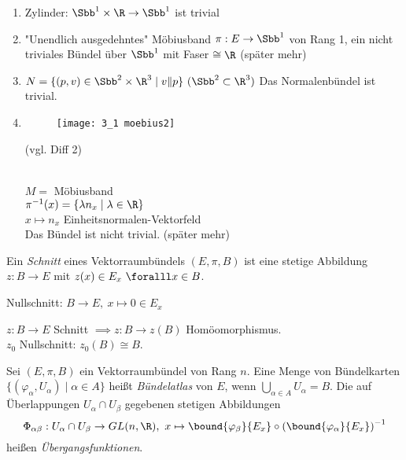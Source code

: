 \begin{exmp*}
	\begin{enumerate}[label = {\roman*})]
		\item 	Zylinder: $ \Sbb^1 \times \R \to \Sbb^1 $ ist trivial
		\item "Unendlich ausgedehntes" Möbiusband  $ \pi: E \to \Sbb^1 $ von Rang 1, ein nicht triviales Bündel über $\Sbb^1$ mit Faser $\cong \R$ (später mehr)
		\item $ N = \{(p,v) \in \Sbb^2 \times \R^3 \mid v \| p\}\ (\Sbb^2 \subset \R^3) $
			Das Normalenbündel ist trivial.
		\item \begin{minipage}{\linewidth}
				\begin{wrapfigure}{R}{5cm}
					\centering
					\texttt{[image: 3\_1 moebius2]}
				\end{wrapfigure}
				(vgl. Diff 2)
			\end{minipage} \\
			$ M = $ Möbiusband\\
			$ \pi^{-1}(x) = \{\lambda n_x \mid \lambda \in \R\} $\\
			$ x \mapsto n_x$ Einheitsnormalen-Vektorfeld\\
			Das Bündel ist nicht trivial. (später mehr)
	\end{enumerate}
\end{exmp*}

\begin{defn}[Schnitt]
	Ein \emph{Schnitt} eines Vektorraumbündels $ (E,\pi,B) $ ist eine stetige Abbildung $ z: B \to E $ mit $z(x) \in E_x\ \foralll x \in B$.
\end{defn}
	
\begin{exmp*}
	Nullschnitt: $ B \to E,\ x \mapsto 0 \in E_x $
\end{exmp*}

\begin{rem*}
	$ z: B \to E $ Schnitt $ \implies z: B \to z(B) $ Homöomorphismus.\\
	$z_0$ Nullschnitt: $z_0(B) \cong B$.
\end{rem*}

\begin{defn} 
	Sei $ (E,\pi,B) $ ein Vektorraumbündel von Rang $n$. Eine Menge von Bündelkarten $ \{(\varphi_\alpha, U_\alpha) \mid \alpha \in A\} $ heißt \emph{Bündelatlas} von $E$, wenn $ \bigcup_{\alpha \in A} U_\alpha = B. $
	Die auf Überlappungen $ U_\alpha \cap U_\beta $ gegebenen stetigen Abbildungen 
	$$ \Phi_{\alpha \beta}: U_\alpha \cap U_\beta \to GL(n,\R),\ x \mapsto \bound{\varphi_\beta}{E_x} \circ \left( \bound{\varphi_\alpha}{E_x} \right)^{-1} $$
	heißen \emph{Übergangsfunktionen}.
\end{defn}

